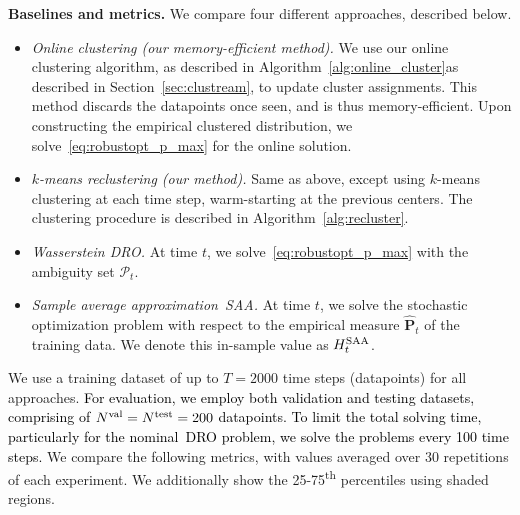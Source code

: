 \documentclass[12pt]{article}
\renewcommand{\paragraph}[1]{\textbf{#1.}\;}
\newcommand{\bnote}[1]{\textcolor{purple}{\textbf{[B: #1]}}}
\newcommand{\prob}{{\mathbf P}}
\newcommand{\epsnom}{\varepsilon}
\newcommand{\RC}[1]{\textcolor{black}{#1}}
\newcommand{\RC}[1]{\textcolor{blue}{#1}}
\begin{document}
\paragraph{Baselines and metrics}
We compare four different approaches, described below. 
\begin{itemize}
    \item \textit{Online clustering (our memory-efficient method).}
    We use our online clustering algorithm, \ifpreprint as described in Algorithm~\ref{alg:online_cluster}\else as described in Section~\ref{sec:clustream}\fi, to update cluster assignments. This method discards the datapoints once seen, and is thus memory-efficient. Upon constructing the empirical clustered distribution, we solve~\eqref{eq:robustopt_p_max} \ifpreprint for the online solution\fi.
    
    \item \textit{$k$-means reclustering (our method).}
    Same as above, except using $k$-means clustering at each time step, warm-starting at the previous centers. \ifpreprint The clustering procedure is described in Algorithm~\ref{alg:recluster}.\fi

    \item \textit{Wasserstein \gls{DRO}.}
    At time $t$, we solve~\eqref{eq:robustopt_p_max} with the ambiguity set $\mathcal{P}_{t}$.

    \item \textit{Sample average approximation~\gls{SAA}.}
    At time $t$, we solve the stochastic optimization problem with respect to the empirical measure $\hat{\prob}_{t}$ of the training data. We denote this in-sample value as $H^{\rm SAA}_t$.
\end{itemize}
We use a training dataset of up to $T = 2000$ time steps (datapoints) for all approaches.
\RC{For evaluation, we employ both validation and testing datasets, comprising of $N^{\rm val} = N^{\rm test} = 200$ datapoints.}
\RC{To limit the total solving time, particularly for the nominal~\gls{DRO} problem, we solve the problems every 100 time steps.} 
We compare the following metrics, with values averaged over 30 repetitions of each experiment. We additionally show the 25-75\textsuperscript{th} percentiles using shaded regions. 
\end{document}
